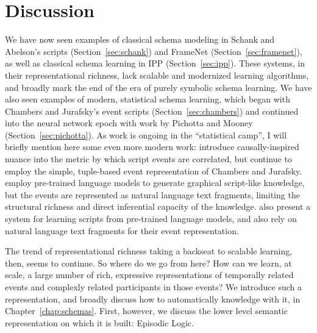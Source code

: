 \section{Discussion}
\label{sec:related_disc}
We have now seen examples of classical schema modeling in Schank and Abelson's scripts (Section~\ref{sec:schank}) and FrameNet (Section~\ref{sec:framenet}), as well as classical schema learning in IPP (Section~\ref{sec:ipp}). These systems, in their representational richness, lack scalable and modernized learning algorithms, and broadly mark the end of the era of purely symbolic schema learning. We have also seen examples of modern, statistical schema learning, which began with Chambers and Jurafsky's event scripts (Section~\ref{sec:chambers}) and continued into the neural network epoch with work by Pichotta and Mooney (Section~\ref{sec:pichotta}). As work is ongoing in the ``statistical camp'', I will briefly mention here some even more modern work: \citet{weber_causal_scripts} introduce causally-inspired nuance into the metric by which script events are correlated, but continue to employ the simple, tuple-based event representation of Chambers and Jurafsky. \citet{proscript} employ pre-trained language models to generate graphical script-like knowledge, but the events are represented as natural language text fragments, limiting the structural richness and direct inferential capacity of the knowledge. \citet{starsem-scripts} also present a system for learning scripts from pre-trained language models, and also rely on natural language text fragments for their event representation.

The trend of representational richness taking a backseat to scalable learning, then, seems to continue. So where do we go from here? How can we learn, at scale, a large number of rich, expressive representations of temporally related events and complexly related participants in those events? We introduce such a representation, and broadly discuss how to automatically knowledge with it, in Chapter~\ref{chap:schemas}. First, however, we discuss the lower level semantic representation on which it is built: Episodic Logic.